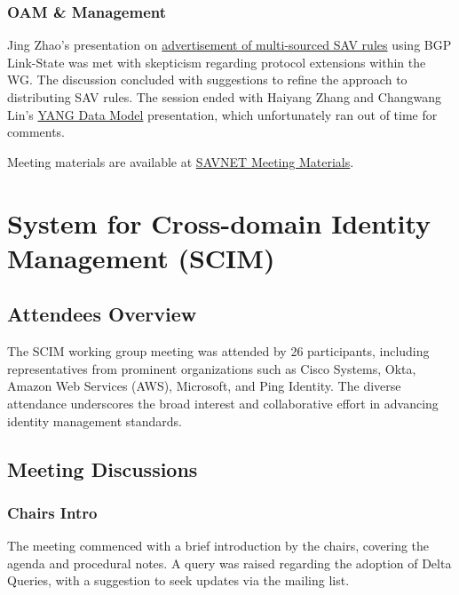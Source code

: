 \documentclass{article}
\begin{document}
\subsubsection{OAM \& Management}
Jing Zhao's presentation on \href{https://datatracker.ietf.org/doc/draft-tong-idr-bgp-ls-sav-rule/}{advertisement of multi-sourced SAV rules} using BGP Link-State was met with skepticism regarding protocol extensions within the WG. The discussion concluded with suggestions to refine the approach to distributing SAV rules. The session ended with Haiyang Zhang and Changwang Lin's \href{https://datatracker.ietf.org/doc/draft-li-savnet-sav-yang/}{YANG Data Model} presentation, which unfortunately ran out of time for comments.

Meeting materials are available at \href{https://datatracker.ietf.org/meeting/122/session/savnet}{SAVNET Meeting Materials}.



\newpage

\section{System for Cross-domain Identity Management (SCIM)}

\subsection{Attendees Overview}

The SCIM working group meeting was attended by 26 participants, including representatives from prominent organizations such as Cisco Systems, Okta, Amazon Web Services (AWS), Microsoft, and Ping Identity. The diverse attendance underscores the broad interest and collaborative effort in advancing identity management standards.

\subsection{Meeting Discussions}

\subsubsection{Chairs Intro}

The meeting commenced with a brief introduction by the chairs, covering the agenda and procedural notes. A query was raised regarding the adoption of Delta Queries, with a suggestion to seek updates via the mailing list.
\end{document}
